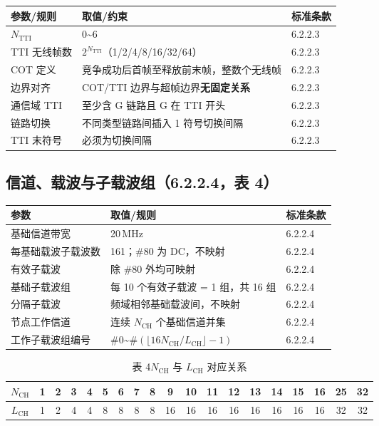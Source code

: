 \documentclass[11pt,a4paper]{ctexart}
\begin{document}
\begin{table}[h]
\centering
\small
\begin{tabular}{lll}
\toprule
\textbf{参数/规则} & \textbf{取值/约束} & \textbf{标准条款} \\
\midrule
$N_{\mathrm{TTI}}$ & 0\textasciitilde 6 & 6.2.2.3 \\
TTI 无线帧数 & $2^{N_{\mathrm{TTI}}}$（1/2/4/8/16/32/64） & 6.2.2.3 \\
COT 定义 & 竞争成功后首帧至释放前末帧，整数个无线帧 & 6.2.2.3 \\
边界对齐 & COT/TTI 边界与超帧边界\textbf{无固定关系} & 6.2.2.3 \\
通信域 TTI & 至少含 G 链路且 G 在 TTI 开头 & 6.2.2.3 \\
链路切换 & 不同类型链路间插入 1 符号切换间隔 & 6.2.2.3 \\
TTI 末符号 & 必须为切换间隔 & 6.2.2.3 \\
\bottomrule
\end{tabular}
\end{table}

\subsection{信道、载波与子载波组（6.2.2.4，表 4）}

\begin{table}[h]
\centering
\small
\begin{tabular}{lll}
\toprule
\textbf{参数} & \textbf{取值/规则} & \textbf{标准条款} \\
\midrule
基础信道带宽 & 20\,MHz & 6.2.2.4 \\
每基础载波子载波数 & 161；\#80 为 DC，不映射 & 6.2.2.4 \\
有效子载波 & 除 \#80 外均可映射 & 6.2.2.4 \\
基础子载波组 & 每 10 个有效子载波 = 1 组，共 16 组 & 6.2.2.4 \\
分隔子载波 & 频域相邻基础载波间，不映射 & 6.2.2.4 \\
节点工作信道 & 连续 $N_{\mathrm{CH}}$ 个基础信道并集 & 6.2.2.4 \\
工作子载波组编号 & \#0\textasciitilde\#$(\lfloor 16 N_{\mathrm{CH}}/L_{\mathrm{CH}} \rfloor - 1)$ & 6.2.2.4 \\
\bottomrule
\end{tabular}
\end{table}

\begin{table}[h]
\centering
\caption{表 4\quad $N_{\mathrm{CH}}$ 与 $L_{\mathrm{CH}}$ 对应关系}
\small
\begin{tabular}{c*{18}{c}}
\toprule
$N_{\mathrm{CH}}$ &
1 & 2 & 3 & 4 & 5 & 6 & 7 & 8 & 9 & 10 & 11 & 12 & 13 & 14 & 15 & 16 & 25 & 32 \\
\midrule
$L_{\mathrm{CH}}$ &
1 & 2 & 4 & 4 & 8 & 8 & 8 & 8 & 16 & 16 & 16 & 16 & 16 & 16 & 16 & 16 & 32 & 32 \\
\bottomrule
\end{tabular}
\end{table}
\end{document}
